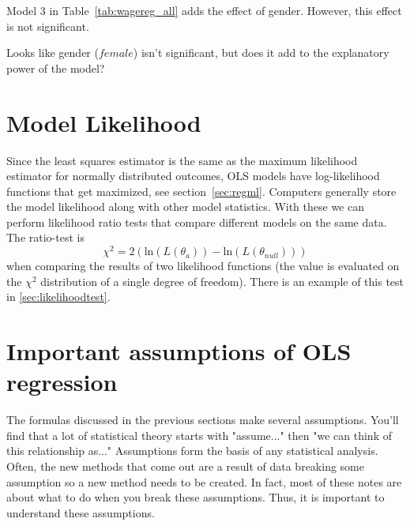 Model 3 in Table~\ref{tab:wagereg_all} adds the effect of gender. However, this effect is not significant.

Looks like gender ($female$) isn't significant, but does it add to the explanatory power of the model?

\section{Model Likelihood}
\label{sec:lrtest}

Since the least squares estimator is the same as the maximum likelihood estimator for normally distributed outcomes, OLS models have log-likelihood functions that get maximized, see section~\ref{sec:regml}.
Computers generally store the model likelihood along with other model statistics. With these we can perform likelihood ratio tests that compare different models on the same data. The ratio-test is
\begin{equation}\label{eq:lrtest}
\chi^2=2\left(\mbox{ln}\left(L\left(\theta_a\right)\right)-\mbox{ln}\left(L\left(\theta_{null}\right)\right)\right)
\end{equation}
when comparing the results of two likelihood functions (the value is evaluated on the $\chi^2$ distribution of a single degree of freedom). There is an example of this test in \ref{sec:likelihoodtest}.

\section{Important assumptions of OLS regression}
The formulas discussed in the previous sections make several assumptions. You'll find that a lot of statistical theory starts with "assume..." then "we can think of this relationship as..." Assumptions form the basis of any statistical analysis. Often, the new methods that come out are a result of data breaking some assumption so a new method needs to be created. In fact, most of these notes are about what to do when you break these assumptions. Thus, it is important to understand these assumptions.
